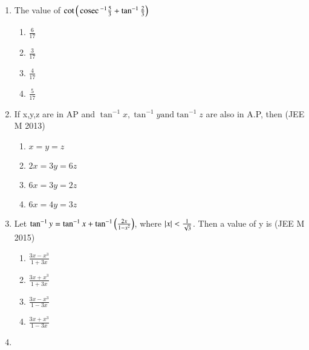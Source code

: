 \documentclass[journal,12pt,twocolumn]{IEEEtran}
\theoremstyle{remark}
\begin{document}
\begin{enumerate}
{\begin{multicols}{2}
		\begin{enumerate}
			\item{$4$}
			\item{$5$}
			\columnbreak
			\item{$1$}
			\item{$3$}
		\end{enumerate}
		\end{multicols}
	}
	\item{
			The value of $\cot\left(\,\text{cosec}\,^{-1}\frac{5}{3} + \tan^{-1}\frac{2}{3}\right)$
		\begin{multicols}{2}
		\begin{enumerate}
			\item{$\frac{6}{17}$}
			\item{$\frac{3}{17}$}
			\columnbreak
			\item{$ \frac{4}{17}$}
			\item{$ \frac{5}{17}$}
		\end{enumerate}
		\end{multicols}
	}
	\item{
			If x,y,z are in AP and $\tan^{-1}x, \tan^{-1}y \text{and} \tan^{-1}z$ are also in A.P, then \hfill (JEE M 2013)
		\begin{multicols}{2}
		\begin{enumerate}
			\item{$x=y=z$}
			\item{$2x=3y=6z$}
			\columnbreak
			\item{$6x=3y=2z$}
			\item{$6x=4y=3z$}
		\end{enumerate}
		\end{multicols}
	}
	\item{
			Let $\tan^{-1}y = \tan^{-1}x + \tan^{-1}\left(\frac{2x}{1-x^2}\right)$, where $\left\vert x\right\vert < \frac{1}{\sqrt{3}}$. Then a value of y is \hfill (JEE M 2015)
		\begin{multicols}{2}
		\begin{enumerate}
			\item{$\frac{3x - x^3}{1 + 3x}$}\\
			\item{$\frac{3x + x^3}{1 + 3x}$}
			\columnbreak
			\item{$\frac{3x - x^3}{1 - 3x}$}\\
			\item{$\frac{3x + x^3}{1 - 3x}$}
		\end{enumerate}
		\end{multicols}
	}
	\item{
}
\end{enumerate}
\end{document}
